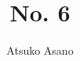 

\title{No. 6}
\author{Atsuko Asano}
\newcommand{\press}{Kodansha}


	\pagestyle{empty}
	\firsttitlepage
	\cleardoublepage
	\secondtitlepage
	
	\frontmatter
	
	\pagestyle{main}

	\cleardoublepage
	\pagestyle{bare}
	\tableofcontents*
	
	\mainmatter
	\pagestyle{main}
